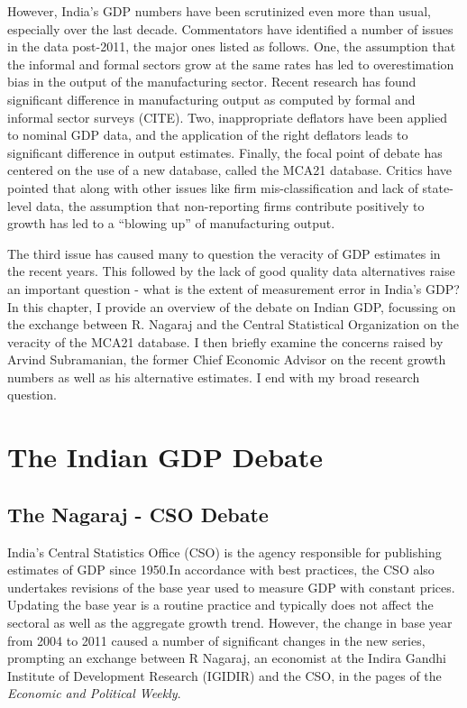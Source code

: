 \documentclass[12pt,nobind, a4paper]{reedthesis}
\begin{document}
 However, India's GDP numbers have been scrutinized even more than usual, especially over the last decade. Commentators have identified a number of issues in the data post-2011, the major ones listed as follows. One, the assumption that the informal and formal sectors grow at the same rates has led to overestimation bias in the output of the manufacturing sector. Recent research has found significant difference in manufacturing output as computed by formal and informal sector surveys (CITE). Two, inappropriate deflators have been applied to nominal GDP data, and the application of the right deflators leads to significant difference in output estimates. Finally, the focal point of debate has centered on the use of a new database, called the MCA21 database. Critics have pointed that along with other issues like firm mis-classification and lack of state-level data, the assumption that non-reporting firms contribute positively to growth has led to a ``blowing up'' of manufacturing output.
 \linebreak

 The third issue has caused many to question the veracity of GDP estimates in the recent years. This followed by the lack of good quality data alternatives raise an important question - what is the extent of measurement error in India's GDP? In this chapter, I provide an overview of the debate on Indian GDP, focussing on the exchange between R. Nagaraj and the Central Statistical Organization on the veracity of the MCA21 database. I then briefly examine the concerns raised by Arvind Subramanian, the former Chief Economic Advisor on the recent growth numbers as well as his alternative estimates. I end with my broad research question.

 \hypertarget{the-indian-gdp-debate}{%
 \section{The Indian GDP Debate}\label{the-indian-gdp-debate}}

 \hypertarget{the-nagaraj---cso-debate}{%
 \subsection{The Nagaraj - CSO Debate}\label{the-nagaraj---cso-debate}}

 India's Central Statistics Office (CSO) is the agency responsible for publishing estimates of GDP since 1950.In accordance with best practices, the CSO also undertakes revisions of the base year used to measure GDP with constant prices. Updating the base year is a routine practice and typically does not affect the sectoral as well as the aggregate growth trend. However, the change in base year from 2004 to 2011 caused a number of significant changes in the new series, prompting an exchange between R Nagaraj, an economist at the Indira Gandhi Institute of Development Research (IGIDIR) and the CSO, in the pages of the \emph{Economic and Political Weekly}.
 \linebreak
\end{document}
